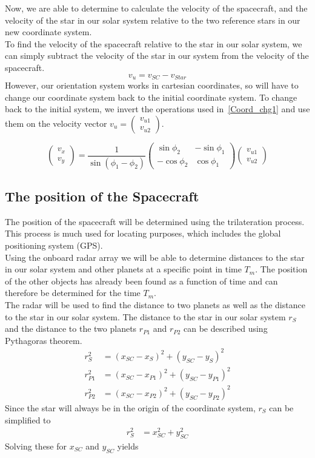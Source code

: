 \documentclass[reprint,english,notitlepage]{revtex4-2}
\begin{document}
Now, we are able to determine to calculate the velocity of the spacecraft, and the velocity of the star in our solar system relative to the two reference stars in our new coordinate system.\\
To find the velocity of the spacecraft relative to the star in our solar system, we can simply subtract the velocity of the star in our system from the velocity of the spacecraft.
\[
v_u = v_{SC}-v_{Star}
\]
However, our orientation system works in cartesian coordinates, so will have to change our coordinate system back to the initial coordinate system.
To change back to the initial system, we invert the operations used in~\eqref{Coord_chg1} and use them on the velocity vector
$v_u = \begin{pmatrix}
    v_{u1}\\ v_{u2}
\end{pmatrix}$.

\[
    \begin{pmatrix}
        v_x\\
		v_y
    \end{pmatrix}
	 = \frac{1}{\sin\left(\phi_1 - \phi_2 \right)}
	\begin{pmatrix}
	    \sin \phi_2 & -\sin \phi_1\\
		-\cos \phi_2 & \cos \phi_1
	\end{pmatrix}
	\begin{pmatrix}
		v_{u1}\\ v_{u2}
	\end{pmatrix}
\]


\subsection{The position of the Spacecraft}\label{subsec:the-position-of-the-spacecraft}
The position of the spacecraft will be determined using the trilateration process.
This process is much used for locating purposes, which includes the global positioning system (GPS).\\
Using the onboard radar array we will be able to determine distances to the star in our solar system and other planets at a specific point in time $T_m$.
The position of the other objects has already been found as a function of time and can therefore be determined for the time $T_m$.\\
The radar will be used to find the distance to two planets as well as the distance to the star in our solar system.
The distance to the star in our solar system $r_S$ and the distance to the two planets $r_{P1}$ and $r_{P2}$ can be described using Pythagoras theorem.
\begin{align*}
    r_S^2 &= (x_{SC} - x_S)^2 + (y_{SC} - y_S)^2\\
	r_{P1}^2 &= (x_{SC} - x_{P1})^2 + (y_{SC} - y_{P1})^2\\
	r_{P2}^2 &= (x_{SC} - x_{P2})^2 + (y_{SC} - y_{P2})^2
\end{align*}
Since the star will always be in the origin of the coordinate system, $r_S$ can be simplified to
\begin{align*}
    r_S^2 &= x_{SC}^2 + y_{SC}^2
\end{align*}
Solving these for $x_{SC}$ and $y_{SC}$ yields
\end{document}
